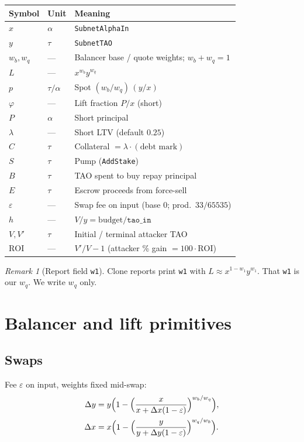 \documentclass[11pt]{article}
\theoremstyle{definition}
\theoremstyle{remark}
\newtheorem{remark}{Remark}
\begin{document}
\begin{center}
\begin{tabular}{@{}llp{}@{}}
\toprule
Symbol & Unit & Meaning \\
\midrule
$x$ & $\alpha$ & \texttt{SubnetAlphaIn} \\
$y$ & $\tau$ & \texttt{SubnetTAO} \\
$w_b,w_q$ & --- & Balancer base / quote weights; $w_b+w_q=1$ \\
$L$ & --- & $x^{w_b}y^{w_q}$ \\
$p$ & $\tau/\alpha$ & Spot $(w_b/w_q)\,(y/x)$ \\
$\varphi$ & --- & Lift fraction $P/x$ (short) \\
$P$ & $\alpha$ & Short principal \\
$\lambda$ & --- & Short LTV (default $0.25$) \\
$C$ & $\tau$ & Collateral $=\lambda\cdot(\text{debt mark})$ \\
$S$ & $\tau$ & Pump (\texttt{AddStake}) \\
$B$ & $\tau$ & TAO spent to buy repay principal \\
$E$ & $\tau$ & Escrow proceeds from force-sell \\
$\varepsilon$ & --- & Swap fee on input (base $0$; prod.\ $33/65535$) \\
$h$ & --- & $V/y=\mathrm{budget}/\texttt{tao\_in}$ \\
$V,V'$ & $\tau$ & Initial / terminal attacker TAO \\
$\mathrm{ROI}$ & --- & $V'/V-1$ (attacker \% gain $=100\cdot\mathrm{ROI}$) \\
\bottomrule
\end{tabular}
\end{center}

\begin{remark}[Report field \texttt{w1}]
Clone reports print \texttt{w1} with $L\approx x^{1-w_1}y^{w_1}$.
That \texttt{w1} is our $w_q$. We write $w_q$ only.
\end{remark}

\section{Balancer and lift primitives}
\label{sec:primitives}

\subsection{Swaps}
Fee $\varepsilon$ on input, weights fixed mid-swap:
\begin{align}
\label{eq:sell}
\Delta y &= y\Bigl(1-\Bigl(\frac{x}{x+\Delta x(1-\varepsilon)}\Bigr)^{w_b/w_q}\Bigr),\\
\label{eq:buy}
\Delta x &= x\Bigl(1-\Bigl(\frac{y}{y+\Delta y(1-\varepsilon)}\Bigr)^{w_q/w_b}\Bigr).
\end{align}
\end{document}
